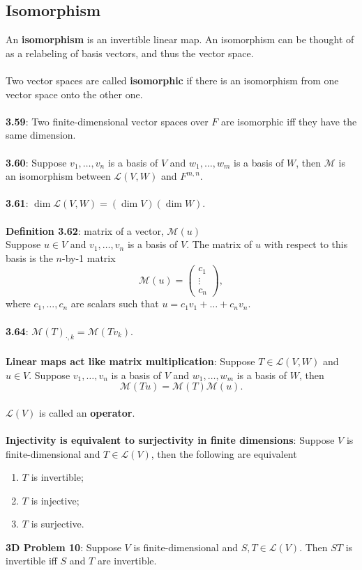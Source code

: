 \documentclass{article}
\DeclareMathOperator{\Dim}{dim}
\theoremstyle{definition}
\begin{document}
\subsection*{Isomorphism}
An \textbf{isomorphism} is an invertible linear map. An isomorphism can be thought of as a relabeling of basis vectors, and thus the vector space. \\ \\
Two vector spaces are called \textbf{isomorphic} if there is an isomorphism from one vector space onto the other one. \\ \\
\textbf{3.59}: Two finite-dimensional vector spaces over $F$ are isomorphic iff they have the same dimension. \\ \\
\textbf{3.60}: Suppose $v_1, \dots, v_n$ is a basis of $V$ and $w_1, \dots, w_m$ is a basis of $W$, then $\mathcal{M}$ is an isomorphism between $\mathcal{L}(V, W)$ and $F^{m, n}$. \\ \\
\textbf{3.61}: $\Dim{\mathcal{L}(V, W)} = (\Dim{V})(\Dim{W})$. \\ \\
\textbf{Definition 3.62}: matrix of a vector, $\mathcal{M}(u)$ \\
Suppose $u \in V$ and $v_1, \dots, v_n$ is a basis of $V$. The matrix of $u$ with respect to this basis is the $n$-by-1 matrix $$\mathcal{M}(u) = \begin{pmatrix}
c_1 \\
\vdots \\ 
c_n
\end{pmatrix},$$ where $c_1, \dots, c_n$ are scalars such that $u = c_1v_1 + \dots + c_nv_n$. \\ \\
\textbf{3.64}: $\mathcal{M}(T)_{\cdot, k} = \mathcal{M}(Tv_k)$. \\ \\
\textbf{Linear maps act like matrix multiplication}: Suppose $T \in \mathcal{L}(V, W)$ and $u \in V$. Suppose $v_1, \dots, v_n$ is a basis of $V$ and $w_1, \dots, w_m$ is a basis of $W$, then $$\mathcal{M}(Tu) = \mathcal{M}(T)\mathcal{M}(u).$$ \\
$\mathcal{L}(V)$ is called an \textbf{operator}. \\ \\
\textbf{Injectivity is equivalent to surjectivity in finite dimensions}: Suppose $V$ is finite-dimensional and $T \in \mathcal{L}(V)$, then the following are equivalent \begin{enumerate} 
\item $T$ is invertible;
\item $T$ is injective;
\item $T$ is surjective.
\end{enumerate} $ $ \\
\textbf{3D Problem 10}: Suppose $V$ is finite-dimensional and $S, T \in \mathcal{L}(V)$. Then $ST$ is invertible iff $S$ and $T$ are invertible.
\end{document}

